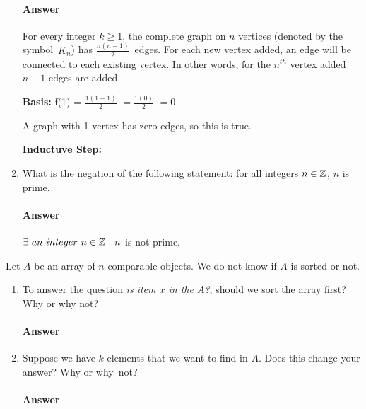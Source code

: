 \documentclass{article}
\begin{document}
\begin{enumerate}
	      \paragraph{Answer}
	      For every integer $k \geq 1$, the complete graph on
	      $n$ vertices (denoted by the symbol~$K_n$) has $\frac{n(n-1)}{2}$~edges.
	      For each new vertex added, an edge will be connected to each existing vertex.
	      In other words, for the $n^{th}$ vertex added $n-1$ edges are added.
	      
	      
		      {\bf Basis:} f(1) = $\frac{1(1-1)}{2}$
	      $=\frac{1(0)}{2}$
	      $=0$
	      
	      A graph with 1 vertex has zero edges, so this is true.
	      
		      {\bf Inductuve Step: }
	      
	      
	      
	      
	      \todo{}
	      
	\item What is the negation of the following statement: for all integers $n
		      \in {\mathbb Z}$, $n$ is prime.
	      
	      \paragraph{Answer}
	      $\exists\ an\ integer\ n \in \Z\ |\ n$ is not prime.
	      
\end{enumerate}


\collab{\todo{}}
Let $A$ be an array of $n$ comparable objects.  We do not know if $A$ is sorted
or not.

\begin{enumerate}
	\item To answer the question \emph{is item $x$ in the $A$?}, should we
	      sort the array first?  Why or why not?
	      
	      \paragraph{Answer}
	      \todo{}
	      
	\item Suppose we have $k$ elements that we want to find in $A$. Does this
	      change your answer? Why or why~not?
	      
	      \paragraph{Answer}
	      \todo{}
	      
\end{enumerate}
\end{document}
